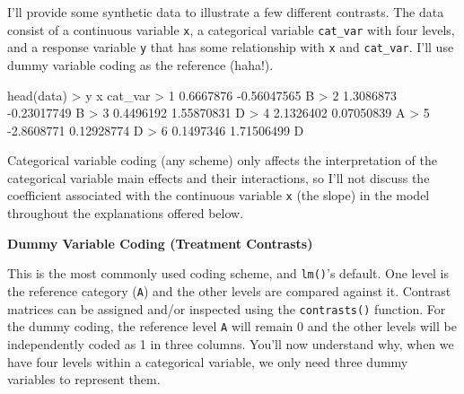 \documentclass[
  letterpaper,
]{book}
\newenvironment{Shaded}{\begin{snugshade}}{\end{snugshade}}
\newcommand{\CommentTok}[1]{\textcolor[rgb]{0.37,0.37,0.37}{#1}}
\newcommand{\DecValTok}[1]{\textcolor[rgb]{0.68,0.00,0.00}{#1}}
\newcommand{\FloatTok}[1]{\textcolor[rgb]{0.68,0.00,0.00}{#1}}
\newcommand{\FunctionTok}[1]{\textcolor[rgb]{0.28,0.35,0.67}{#1}}
\newcommand{\NormalTok}[1]{\textcolor[rgb]{0.00,0.23,0.31}{#1}}
\newcommand{\SpecialCharTok}[1]{\textcolor[rgb]{0.37,0.37,0.37}{#1}}
\begin{document}
I'll provide some synthetic data to illustrate a few different
contrasts. The data consist of a continuous variable \texttt{x}, a
categorical variable \texttt{cat\_var} with four levels, and a response
variable \texttt{y} that has some relationship with \texttt{x} and
\texttt{cat\_var}. I'll use dummy variable coding as the reference
(haha!).

\begin{Shaded}
\begin{Highlighting}[]
\FunctionTok{head}\NormalTok{(data)}
\SpecialCharTok{\textgreater{}}\NormalTok{            y           x cat\_var}
\SpecialCharTok{\textgreater{}} \DecValTok{1}  \FloatTok{0.6667876} \SpecialCharTok{{-}}\FloatTok{0.56047565}\NormalTok{       B}
\SpecialCharTok{\textgreater{}} \DecValTok{2}  \FloatTok{1.3086873} \SpecialCharTok{{-}}\FloatTok{0.23017749}\NormalTok{       B}
\SpecialCharTok{\textgreater{}} \DecValTok{3}  \FloatTok{0.4496192}  \FloatTok{1.55870831}\NormalTok{       D}
\SpecialCharTok{\textgreater{}} \DecValTok{4}  \FloatTok{2.1326402}  \FloatTok{0.07050839}\NormalTok{       A}
\SpecialCharTok{\textgreater{}} \DecValTok{5} \SpecialCharTok{{-}}\FloatTok{2.8608771}  \FloatTok{0.12928774}\NormalTok{       D}
\SpecialCharTok{\textgreater{}} \DecValTok{6}  \FloatTok{0.1497346}  \FloatTok{1.71506499}\NormalTok{       D}
\end{Highlighting}
\end{Shaded}

Categorical variable coding (any scheme) only affects the interpretation
of the categorical variable main effects and their interactions, so I'll
not discuss the coefficient associated with the continuous variable
\texttt{x} (the slope) in the model throughout the explanations offered
below.

\textbf{Dummy Variable Coding (Treatment Contrasts)}

This is the most commonly used coding scheme, and \texttt{lm()}'s
default. One level is the reference category (\texttt{A}) and the other
levels are compared against it. Contrast matrices can be assigned and/or
inspected using the \texttt{contrasts()} function. For the dummy coding,
the reference level \texttt{A} will remain 0 and the other levels will
be independently coded as 1 in three columns. You'll now understand why,
when we have four levels within a categorical variable, we only need
three dummy variables to represent them.

\begin{Shaded}
\end{Shaded}
\end{document}
